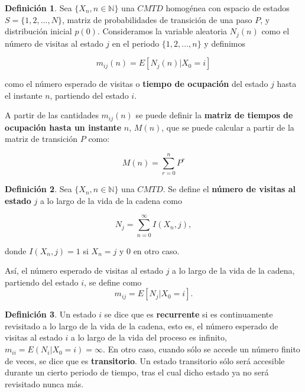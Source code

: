 \documentclass[
]{book}
\newenvironment{yellowbox}{
  \definecolor{shadecolor}{rgb}{210, 180, 140}  
  \color{black}
  \begin{shaded}}
 {\end{shaded}}
\theoremstyle{definition}
\newtheorem{definition}{Definición}[chapter]
\theoremstyle{definition}
\theoremstyle{definition}
\theoremstyle{definition}
\theoremstyle{remark}
\begin{document}
\begin{yellowbox}

\begin{definition}

Sea \(\{X_n, n \in \mathbb{N}\}\) una \(CMTD\) homogénea con espacio de estados \(S = \{1, 2,...,N\}\), matriz de probabilidades de transición de una paso \(P\), y distribución inicial \(p(0)\). Consideramos la variable aleatoria \(N_j(n)\) como el número de visitas al estado \(j\) en el periodo \(\{1, 2,...,n\}\) y definimos

\[m_{ij}(n) = E[N_j(n)|X_0 = i]\]

como el número esperado de visitas o \textbf{tiempo de ocupación} del estado \(j\) hasta el instante \(n\), partiendo del estado \(i\).

A partir de las cantidades \(m_{ij}(n)\) se puede definir la \textbf{matriz de tiempos de ocupación hasta un instante} \(n\), \(M(n)\), que se puede calcular a partir de la matriz de transición \(P\) como:

\begin{equation}
M(n) = \sum_{r=0}^n P^r
\label{eq:tposocupa}
\end{equation}

\end{definition}

\end{yellowbox}

\begin{yellowbox}

\begin{definition}
Sea \(\{X_n, n \in \mathbb{N}\}\) una \(CMTD\). Se define el \textbf{número de visitas al estado} \(j\) a lo largo de la vida de la cadena como

\[N_j=\sum_{n=0}^{\infty} I(X_n,j),\]

donde \(I(X_n,j)=1\) si \(X_n=j\) y 0 en otro caso.

Así, el número esperado de visitas al estado \(j\) a lo largo de la vida de la cadena, partiendo del estado \(i\), se define como \[m_{ij} = E[N_j|X_0 = i].\]
\end{definition}

\end{yellowbox}

\begin{yellowbox}

\begin{definition}
Un estado \(i\) se dice que es \textbf{recurrente} si es continuamente revisitado a lo largo de la vida de la cadena, esto es, el número esperado de visitas al estado \(i\) a lo largo de la vida del proceso es infinito, \(m_{ii}=E(N_i|X_0=i)=\infty\). En otro caso, cuando sólo se accede un número finito de veces, se dice que es \textbf{transitorio}. Un estado transitorio sólo será accesible durante un cierto periodo de tiempo, tras el cual dicho estado ya no será revisitado nunca más.
\end{definition}

\end{yellowbox}
\end{document}

